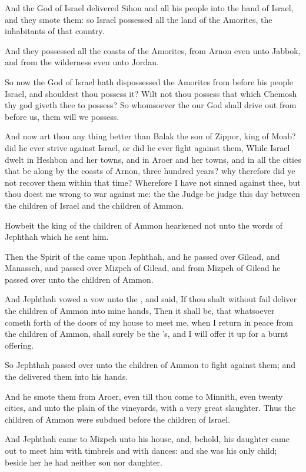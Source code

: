 \verse And the \LORD God of Israel delivered Sihon and all his people into the hand of Israel, and they smote them: so Israel possessed all the land of the Amorites, the inhabitants of that country.

\verse And they possessed all the coasts of the Amorites, from Arnon even unto Jabbok, and from the wilderness even unto Jordan.

\verse So now the \LORD God of Israel hath dispossessed the Amorites from before his people Israel, and shouldest thou possess it?  \verse Wilt not thou possess that which Chemosh thy god giveth thee to possess? So whomsoever the \LORD our God shall drive out from before us, them will we possess.

\verse And now art thou any thing better than Balak the son of Zippor, king of Moab? did he ever strive against Israel, or did he ever fight against them, \verse While Israel dwelt in Heshbon and her towns, and in Aroer and her towns, and in all the cities that be along by the coasts of Arnon, three hundred years? why therefore did ye not recover them within that time?  \verse Wherefore I have not sinned against thee, but thou doest me wrong to war against me: the \LORD the Judge be judge this day between the children of Israel and the children of Ammon.

\verse Howbeit the king of the children of Ammon hearkened not unto the words of Jephthah which he sent him.

\verse Then the Spirit of the \LORD came upon Jephthah, and he passed over Gilead, and Manasseh, and passed over Mizpeh of Gilead, and from Mizpeh of Gilead he passed over unto the children of Ammon.

\verse And Jephthah vowed a vow unto the \LORD, and said, If thou shalt without fail deliver the children of Ammon into mine hands, \verse Then it shall be, that whatsoever cometh forth of the doors of my house to meet me, when I return in peace from the children of Ammon, shall surely be the \LORD's, and I will offer it up for a burnt offering.

\verse So Jephthah passed over unto the children of Ammon to fight against them; and the \LORD delivered them into his hands.

\verse And he smote them from Aroer, even till thou come to Minnith, even twenty cities, and unto the plain of the vineyards, with a very great slaughter. Thus the children of Ammon were subdued before the children of Israel.

\verse And Jephthah came to Mizpeh unto his house, and, behold, his daughter came out to meet him with timbrels and with dances: and she was his only child; beside her he had neither son nor daughter.

